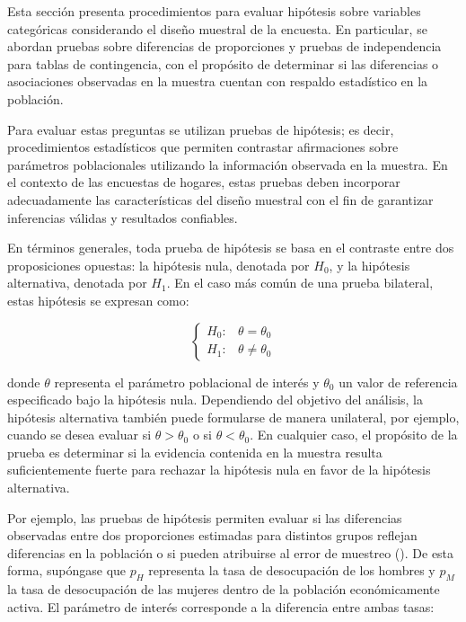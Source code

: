 \documentclass[
  spanish,
  11pt,
  letterpaper,
  oneside,
  open=any]{scrbook}
\begin{document}
Esta sección presenta procedimientos para evaluar hipótesis sobre
variables categóricas considerando el diseño muestral de la encuesta. En
particular, se abordan pruebas sobre diferencias de proporciones y
pruebas de independencia para tablas de contingencia, con el propósito
de determinar si las diferencias o asociaciones observadas en la muestra
cuentan con respaldo estadístico en la población.

Para evaluar estas preguntas se utilizan pruebas de hipótesis; es decir,
procedimientos estadísticos que permiten contrastar afirmaciones sobre
parámetros poblacionales utilizando la información observada en la
muestra. En el contexto de las encuestas de hogares, estas pruebas deben
incorporar adecuadamente las características del diseño muestral con el
fin de garantizar inferencias válidas y resultados confiables.

En términos generales, toda prueba de hipótesis se basa en el contraste
entre dos proposiciones opuestas: la hipótesis nula, denotada por
\(H_0\), y la hipótesis alternativa, denotada por \(H_1\). En el caso
más común de una prueba bilateral, estas hipótesis se expresan como:

\[
\begin{cases}
H_{0}: & \theta = \theta_0 \\
H_{1}: & \theta \neq \theta_0
\end{cases}
\]

donde \(\theta\) representa el parámetro poblacional de interés y
\(\theta_0\) un valor de referencia especificado bajo la hipótesis nula.
Dependiendo del objetivo del análisis, la hipótesis alternativa también
puede formularse de manera unilateral, por ejemplo, cuando se desea
evaluar si \(\theta > \theta_0\) o si \(\theta < \theta_0\). En
cualquier caso, el propósito de la prueba es determinar si la evidencia
contenida en la muestra resulta suficientemente fuerte para rechazar la
hipótesis nula en favor de la hipótesis alternativa.

Por ejemplo, las pruebas de hipótesis permiten evaluar si las
diferencias observadas entre dos proporciones estimadas para distintos
grupos reflejan diferencias en la población o si pueden atribuirse al
error de muestreo (). De esta forma, supóngase que \(p_H\) representa la tasa de
desocupación de los hombres y \(p_M\) la tasa de desocupación de las
mujeres dentro de la población económicamente activa. El parámetro de
interés corresponde a la diferencia entre ambas tasas:
\end{document}
